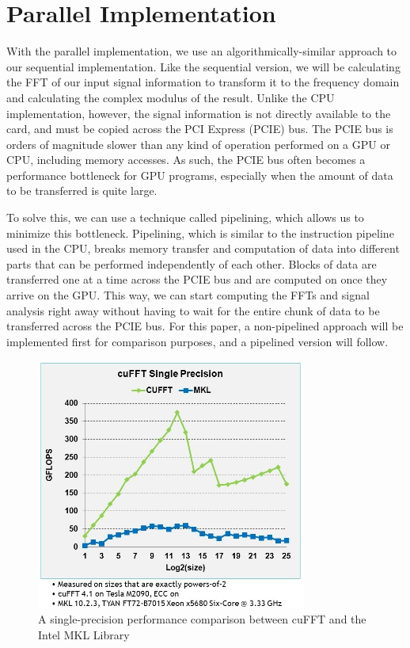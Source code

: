 \documentclass[conference]{IEEEtran}
\begin{document}
\section{Parallel Implementation}

With the parallel implementation, we use an algorithmically-similar approach 
to our sequential implementation. Like the sequential version, we will be calculating
the FFT of our input signal information to transform it to the frequency domain
and calculating the complex modulus of the result. Unlike the CPU implementation,
however, the signal information is not directly available to the card, and must
be copied across the PCI Express (PCIE) bus. The PCIE bus is orders of magnitude
slower than any kind of operation performed on a GPU or CPU, including memory
accesses. As such, the PCIE bus often becomes a performance bottleneck for
GPU programs, especially when the amount of data to be transferred is quite large.

To solve this, we can use a technique called pipelining, which allows us to
minimize this bottleneck. Pipelining, which is similar to the instruction
pipeline used in the CPU, breaks memory transfer and computation of data into different
parts that can be performed independently of each other. Blocks of data are transferred
one at a time across the PCIE bus and are computed on once they arrive on the GPU.
This way, we can start computing the FFTs and signal analysis right away without
having to wait for the entire chunk of data to be transferred across the PCIE
bus. For this paper, a non-pipelined approach will be implemented first for
comparison purposes, and a pipelined version will follow.

\begin{figure}[ht!]
\centering
\includegraphics[width=3.5in]{cufftperformance.jpg}
\caption{A single-precision performance comparison between cuFFT and the Intel MKL Library \cite{nvidia:cufft}}
\label{fig:cufftmklperformance}
\end{figure}
\end{document}
